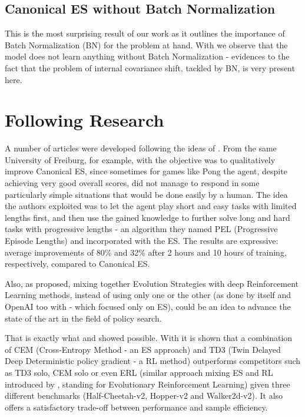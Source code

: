 \documentclass[10pt]{article} %
\begin{document}
\subsection{Canonical ES without Batch Normalization}
This is the most surprising result of our work as it outlines the importance of Batch Normalization (BN) for the problem at hand. With  we observe that the model does not learn anything without Batch Normalization - evidences to the fact that the problem of internal covariance shift, tackled by BN, is very present here.

\section{Following Research}
A number of articles were developed following the ideas of \cite{back-to-basics}. From the same University of Freiburg, for example, with \cite{pel} the objective was to qualitatively improve Canonical ES, since sometimes for games like Pong the agent, despite achieving very good overall scores, did not manage to respond in some particularly simple situations that would be done easily by a human. The idea the authors exploited was to let the agent play short and easy tasks with limited lengths first, and then use the gained knowledge to further solve long and hard tasks with progressive lengths - an algorithm they named PEL (Progressive
Episode Lengths) and incorporated with the ES. The results are expressive: average improvements of 80\% and 32\% after 2 hours and 10 hours of training, respectively, compared to Canonical ES.

Also, as \cite{back-to-basics} proposed, mixing together Evolution Strategies with deep Reinforcement Learning methods, instead of using only one or the other (as done by \cite{back-to-basics} itself and OpenAI too with \cite{salimans2017evolution} -  which focused only on ES), could be an idea to advance the state of the art in the field of policy search. 

That is exactly what \cite{cem-rl} and \cite{erl} showed possible. With \cite{cem-rl} it is shown that a combination of CEM (Cross-Entropy Method - an ES approach) and TD3 (Twin Delayed Deep Deterministic policy gradient - a RL method) outperforms competitors such as TD3 solo, CEM solo or even ERL (similar approach mixing ES and RL introduced by \cite{erl}, standing for Evolutionary
Reinforcement Learning) given three different benchmarks (Half-Cheetah-v2, Hopper-v2 and Walker2d-v2). It also offers a satisfactory trade-off between performance and sample efficiency. 
\end{document}
